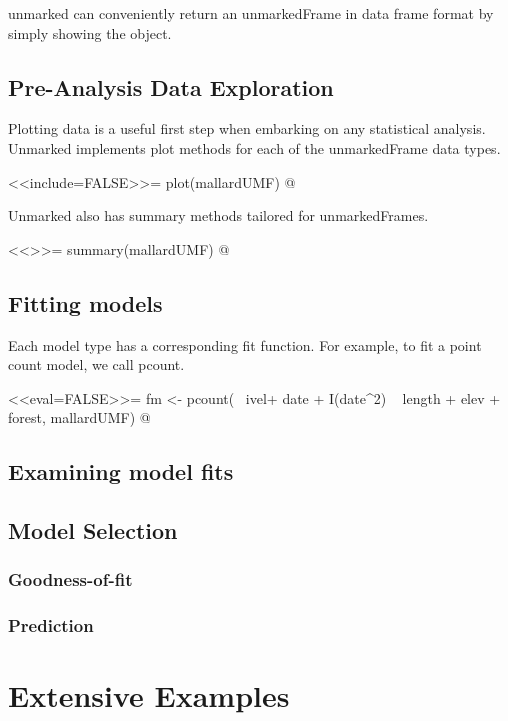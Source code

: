 unmarked can conveniently return an unmarkedFrame in data frame format
by simply showing the object.



\subsection{Pre-Analysis Data Exploration}

Plotting data is a useful first step when embarking on any statistical analysis.
Unmarked implements plot methods for each of the unmarkedFrame data types.

<<include=FALSE>>=
plot(mallardUMF)
@


Unmarked also has summary methods tailored for unmarkedFrames.

<<>>=
summary(mallardUMF)
@


\subsection{Fitting models}

Each model type has a corresponding fit function.  For example, to fit a point count model, we call pcount.

<<eval=FALSE>>=
fm <- pcount(~ ivel+ date + I(date^2) ~ length + elev + forest, mallardUMF)
@


\subsection{Examining model fits}

\subsection{Model Selection}


\subsubsection{Goodness-of-fit}


\subsubsection{Prediction}



\section{Extensive Examples}


